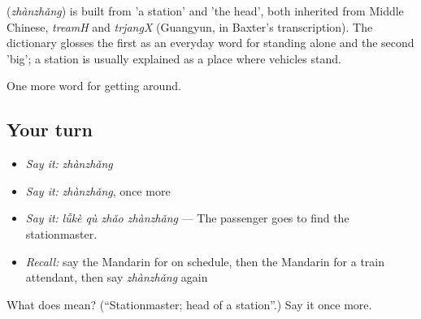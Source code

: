 \begin{cousinweb}
\textbf{} (\emph{zhànzhǎng}) is built from  'a station' and  'the head', both inherited from Middle Chinese, \emph{treamH} and \emph{trjangX} (Guangyun, in Baxter's transcription). The dictionary glosses the first as an everyday word for standing alone and the second 'big'; a station is usually explained as a place where vehicles stand.
\end{cousinweb}

\begin{grammarlens}[title={What you've built}]
One more word for getting around.
\end{grammarlens}

\subsection*{Your turn}
\begin{itemize}
\raggedright
  \item \emph{Say it:} \emph{zhànzhǎng}
  \item \emph{Say it:} \emph{zhànzhǎng}, once more
  \item \emph{Say it:} \emph{lǚkè qù zhǎo zhànzhǎng} — The passenger goes to find the stationmaster.
  \item \emph{Recall:} say the Mandarin for on schedule, then the Mandarin for a train attendant, then say \emph{zhànzhǎng} again
\end{itemize}

\begin{tcolorbox}[breakable,colback=teal!4,colframe=teal!35!black,title={Before you move on}]
What does  mean? (\textquotedblleft{}Stationmaster; head of a station\textquotedblright{}.) Say it once more.
\end{tcolorbox}
